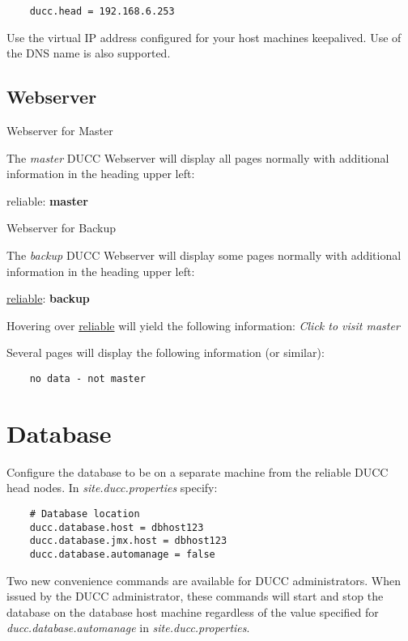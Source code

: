 \documentclass[letterpaper]{article}
\begin{document}
    \begin{verbatim}
	ducc.head = 192.168.6.253
   	\end{verbatim}
    
    Use the virtual IP address configured for your host machines keepalived. 
    Use of the DNS name is also supported.  
    
\subsection{Webserver}

	Webserver for Master

	The {\em master} DUCC Webserver will display all pages normally with additional
	information in the heading upper left:
	
	reliable: \textbf{master}
	
	Webserver for Backup
	
	The {\em backup} DUCC Webserver will display some pages normally with additional
	information in the heading upper left:
	
	\underline{reliable}: \textbf{backup}
   	
   	Hovering over \underline{reliable} will yield the following information:
   	{\em Click to visit master}
   	
   	Several pages will display the following information (or similar):
   	
   	\begin{verbatim}
	no data - not master
   	\end{verbatim}

\section{Database}

	Configure the database to be on a separate machine from the reliable DUCC head nodes.
	In {\em site.ducc.properties} specify:
	
	\begin{verbatim}
	# Database location
    ducc.database.host = dbhost123
    ducc.database.jmx.host = dbhost123
    ducc.database.automanage = false
   	\end{verbatim}
	
	Two new convenience commands are available for DUCC administrators.  
	When issued by the DUCC administrator, these commands will start and stop the database 
	on the database host machine regardless of the value specified for 
	{\em ducc.database.automanage} in {\em site.ducc.properties}.
	
\end{document}
